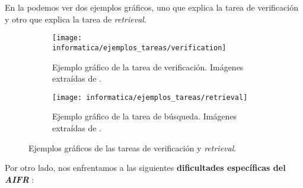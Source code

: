 
En la  podemos ver dos ejemplos gráficos, uno que explica la tarea de verificación y otro que explica la tarea de \textit{retrieval}.

\begin{figure}[!h]
	\centering
	\begin{subfigure}{1.0\textwidth}
		\centering
		\texttt{[image: informatica/ejemplos\_tareas/verification]}
		\caption{Ejemplo gráfico de la tarea de verificación. Imágenes extraídas de \cite{informatica:cacd_dataset}.}
	\end{subfigure}%

	\begin{subfigure}{1.0\textwidth}
		\centering
		\texttt{[image: informatica/ejemplos\_tareas/retrieval]}
		\caption{Ejemplo gráfico de la tarea de búsqueda. Imágenes extraídas de \cite{informatica:cacd_dataset}.}
	\end{subfigure}
	\caption{Ejemplos gráficos de las tareas de verificación y \textit{retrieval}.}
	\label{img:ejemplo_verificacion_retrieval}
\end{figure}

Por otro lado, nos enfrentamos a las siguientes \textbf{dificultades específicas del \textit{AIFR}} \cite{informatica:challenges_retrieval}:

